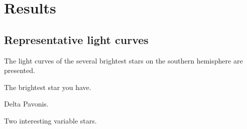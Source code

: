 \documentclass{aa}
\begin{document}



\section{Results}
\label{sec:results}

\subsection{Representative light curves}
The light curves of the several brightest stars on the southern hemisphere are presented.

The brightest star you have.

Delta Pavonis.

Two interesting variable stars.
\end{document}
